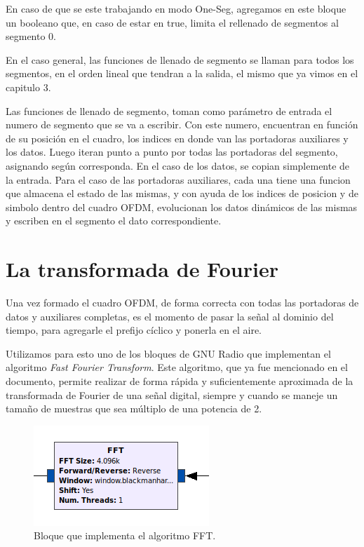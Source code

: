 En caso de que se este trabajando en modo One-Seg, agregamos en este bloque un booleano que, en caso de estar en true, limita el rellenado de segmentos al segmento 0. 

En el caso general, las funciones de llenado de segmento se llaman para todos los segmentos, en el orden lineal que tendran a la salida, el mismo que ya vimos en el capitulo 3.

Las funciones de llenado de segmento, toman como parámetro de entrada el numero de segmento que se va a escribir. Con este numero, encuentran en función de su posición en el cuadro, los indices en donde van las portadoras auxiliares y los datos. Luego iteran punto a punto por todas las portadoras del segmento, asignando según corresponda. En el caso de los datos, se copian simplemente de la entrada. Para el caso de las portadoras auxiliares, cada una tiene una funcion que almacena el estado de las mismas, y con ayuda de los indices de posicion y de simbolo dentro del cuadro OFDM, evolucionan los datos dinámicos de las mismas y escriben en el segmento el dato correspondiente. 
	
\section{La transformada de Fourier}

Una vez formado el cuadro OFDM, de forma correcta con todas las portadoras de datos y auxiliares completas, es el momento de pasar la señal al dominio del tiempo, para agregarle el prefijo cíclico y ponerla en el aire. 

Utilizamos para esto uno de los bloques de GNU Radio que implementan el algoritmo \textit{Fast Fourier Transform}. Este algoritmo, que ya fue mencionado en el documento, permite realizar de forma rápida y suficientemente aproximada de la transformada de Fourier de una señal digital, siempre y cuando se maneje un tamaño de muestras que sea múltiplo de una potencia de 2.

\begin{figure}[!h]
	\centering
	\includegraphics[scale=0.5]{figuras/cap05/fft}
	\caption{\label{f:fft} Bloque que implementa el algoritmo FFT.}
\end{figure}

